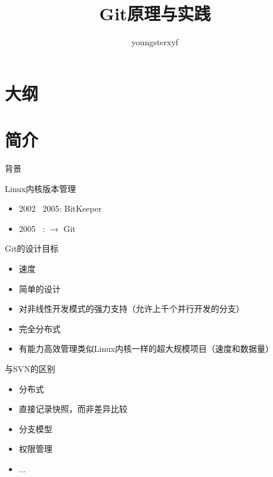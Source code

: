 \documentclass[CJK, 10pt]{beamer}
\begin{document}
\begin{CJK*}{UTF8}{gbsn}

\title{Git原理与实践}
\author{youngsterxyf}
\date{}

\begin{frame}[plain]
	\titlepage
\end{frame}

\section*{大纲}
\begin{frame}
\tableofcontents
\end{frame}

\section{简介}
\begin{frame}{背景}
    \begin{block}{Linux内核版本管理}
    \begin{itemize}
        \item 2002 \textendash\ 2005: BitKeeper
        \item 2005 \textendash\ : $\rightarrow$ Git
    \end{itemize}
    \end{block}
    \begin{block}{Git的设计目标}
    \begin{itemize}
    	\item 速度
    	\item 简单的设计
    	\item 对非线性开发模式的强力支持（允许上千个并行开发的分支）
    	\item 完全分布式
    	\item 有能力高效管理类似Linux内核一样的超大规模项目（速度和数据量）
    \end{itemize}
    \end{block}
\end{frame}
\begin{frame}{与SVN的区别}
    \begin{block}{}
        \begin{itemize}
                \item 分布式
                \item 直接记录快照，而非差异比较
                \item 分支模型
                \item 权限管理
                \item ...
            \end{itemize}
    \end{block}
\end{frame}


\end{CJK*}
\end{document}
